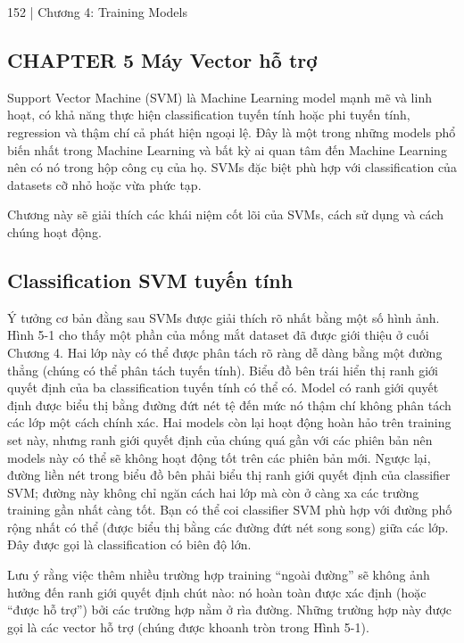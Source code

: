152 | Chương 4: Training Models

\subsection{CHAPTER 5 Máy Vector hỗ trợ}

Support Vector Machine (SVM) là Machine Learning model mạnh mẽ và linh hoạt, có khả năng thực hiện classification tuyến tính hoặc phi tuyến tính, regression và thậm chí cả phát hiện ngoại lệ. Đây là một trong những models phổ biến nhất trong Machine Learning và bất kỳ ai quan tâm đến Machine Learning nên có nó trong hộp công cụ của họ. SVMs đặc biệt phù hợp với classification của datasets cỡ nhỏ hoặc vừa phức tạp.

Chương này sẽ giải thích các khái niệm cốt lõi của SVMs, cách sử dụng và cách chúng hoạt động.

\subsection{Classification SVM tuyến tính}

Ý tưởng cơ bản đằng sau SVMs được giải thích rõ nhất bằng một số hình ảnh. Hình 5-1 cho thấy một phần của mống mắt dataset đã được giới thiệu ở cuối Chương 4. Hai lớp này có thể được phân tách rõ ràng dễ dàng bằng một đường thẳng (chúng có thể phân tách tuyến tính). Biểu đồ bên trái hiển thị ranh giới quyết định của ba classification tuyến tính có thể có. Model có ranh giới quyết định được biểu thị bằng đường đứt nét tệ đến mức nó thậm chí không phân tách các lớp một cách chính xác. Hai models còn lại hoạt động hoàn hảo trên training set này, nhưng ranh giới quyết định của chúng quá gần với các phiên bản nên models này có thể sẽ không hoạt động tốt trên các phiên bản mới. Ngược lại, đường liền nét trong biểu đồ bên phải biểu thị ranh giới quyết định của classifier SVM; đường này không chỉ ngăn cách hai lớp mà còn ở càng xa các trường training gần nhất càng tốt. Bạn có thể coi classifier SVM phù hợp với đường phố rộng nhất có thể (được biểu thị bằng các đường đứt nét song song) giữa các lớp. Đây được gọi là classification có biên độ lớn.

Lưu ý rằng việc thêm nhiều trường hợp training “ngoài đường” sẽ không ảnh hưởng đến ranh giới quyết định chút nào: nó hoàn toàn được xác định (hoặc “được hỗ trợ”) bởi các trường hợp nằm ở rìa đường. Những trường hợp này được gọi là các vector hỗ trợ (chúng được khoanh tròn trong Hình 5-1).

